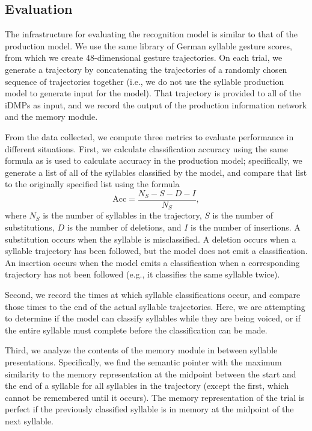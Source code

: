 \subsection{Evaluation}

The infrastructure for evaluating
the recognition model
is similar to that of the production model.
We use the same library
of German syllable gesture scores,
from which we create
48-dimensional gesture trajectories.
On each trial,
we generate a trajectory
by concatenating the trajectories
of a randomly chosen sequence
of trajectories together
(i.e., we do not use the
syllable production model
to generate input for the model).
That trajectory is provided
to all of the iDMPs as input,
and we record the output of the
production information network
and the memory module.

From the data collected,
we compute three metrics
to evaluate performance
in different situations.
First, we calculate
classification accuracy
using the same formula
as is used to calculate
accuracy in the production model;
specifically,
we generate a list of all of the
syllables classified by the model,
and compare that list to the
originally specified list
using the formula
\begin{equation}
  \text{Acc} = \frac{N_S - S - D - I}{N_S},
\end{equation}
where $N_S$ is the number of syllables
in the trajectory,
$S$ is the number of substitutions,
$D$ is the number of deletions,
and $I$ is the number of insertions.
A substitution occurs when
the syllable is misclassified.
A deletion occurs when
a syllable trajectory has been followed,
but the model does not emit a classification.
An insertion occurs
when the model emits a classification
when a corresponding trajectory has not been followed
(e.g., it classifies the same syllable twice).

Second, we record the times at which
syllable classifications occur,
and compare those times
to the end of the actual syllable trajectories.
Here, we are attempting to determine
if the model can classify syllables
while they are being voiced,
or if the entire syllable must complete
before the classification can be made.

Third, we analyze the contents
of the memory module
in between syllable presentations.
Specifically,
we find the semantic pointer
with the maximum similarity
to the memory representation
at the midpoint between
the start and the end of a syllable
for all syllables in the trajectory
(except the first,
which cannot be remembered until it occurs).
The memory representation of the trial
is perfect if the
previously classified syllable
is in memory at the midpoint
of the next syllable.

